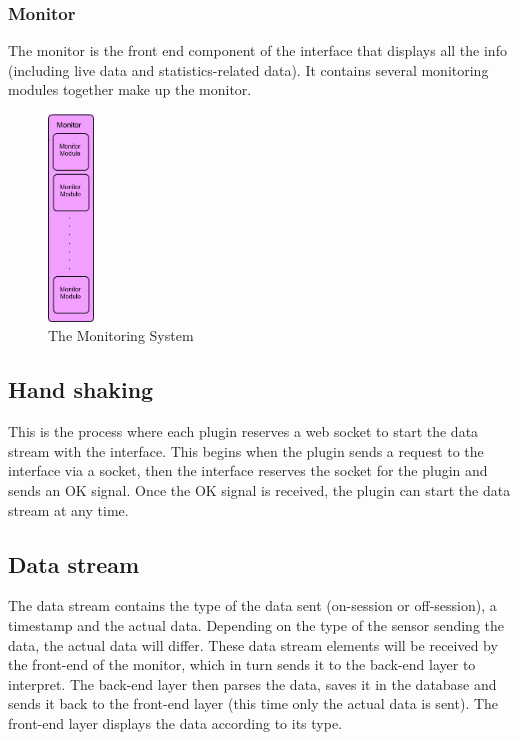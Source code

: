 \documentclass[a4paper]{article}
\begin{document}
\newpage

\subsubsection{Monitor}
The monitor is the front end component of the interface that displays all the info (including live data and statistics-related data). It contains several monitoring modules together make up the monitor.

\begin{figure}[h!]
\centering
\includegraphics[height=55mm]{Monitor.png}
\caption{The Monitoring System}
\label{threadsVsSync}
\end{figure}

\subsection{Hand shaking}
This is the process where each plugin reserves a web socket to start the data stream with the interface. This begins when the plugin sends a request to the interface via a socket, then the interface reserves the socket for the plugin and sends an OK signal. Once the OK signal is received, the plugin can start the data stream at any time.

\subsection{Data stream}
The data stream contains the type of the data sent (on-session or off-session), a timestamp and the actual data. Depending on the type of the sensor sending the data, the actual data will differ. These data stream elements will be received by the front-end of the monitor, which in turn sends it to the back-end layer to interpret. The back-end layer then parses the data, saves it in the database and sends it back to the front-end layer (this time only the actual data is sent). The front-end layer displays the data according to its type.
\end{document}
